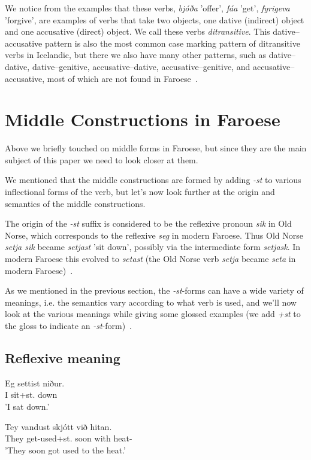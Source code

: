 \documentclass[12pt,%
]{lin-v2/lin}
\let\Oldsubsection\subsection
\renewcommand{\subsection}{\FloatBarrier\Oldsubsection}
\begin{document}
We notice from the examples that these verbs, \emph{bjóða} 'offer', \emph{fáa} 'get', \emph{fyrigeva} 'forgive', are
examples of verbs that take two objects, one dative (indirect) object and one accusative (direct) object. We call these verbs \emph{ditransitive}.
This dative--accusative pattern is also the most common case marking pattern of ditransitive verbs in Icelandic, but there
we also have many other patterns, such as dative--dative, dative--genitive, accusative--dative, accusative--genitive, and
accusative--accusative, most of which are not found in Faroese~\citep[262-263]{faroese}.


\section{Middle Constructions in Faroese}

Above we briefly touched on middle forms in Faroese, but since they are the main subject of this paper we need to look closer at them.

We mentioned that the middle constructions are formed by adding \emph{-st} to various inflectional forms of the verb,
but let's now look further at the origin and semantics of the middle constructions.

The origin of the \emph{-st} suffix is considered to be the reflexive pronoun \emph{sik} in Old Norse,
which corresponds to the reflexive \emph{seg} in modern Faroese. Thus Old Norse \emph{setja sik} became
\emph{setjast} 'sit down', possibly via the intermediate form \emph{setjask}.
In modern Faroese this evolved to \emph{setast} (the Old Norse verb \emph{setja} became \emph{seta} in
modern Faroese)~\citep[277]{faroese}.

As we mentioned in the previous section, the \emph{-st}-forms can have a wide variety of meanings,
i.e. the semantics vary according to what verb is used, and we'll now look at the various meanings
while giving some glossed examples (we add \emph{+st} to the gloss to 
indicate an \emph{-st}-form)~\citep[277-278]{faroese}.

\subsection*{Reflexive meaning}

\begin{exe}
    \ex
    \begin{xlist}
        \item \gll Eg settist niður.\\
        I sit+st.\Pst{} down\\
        \trans 'I sat down.'\\
        \item \gll Tey vandust skjótt við hitan.\\
        They {get-used}+st.\Pst{} soon with heat-\Def{}\\
        \trans 'They soon got used to the heat.'
    \end{xlist}
\end{exe}
\end{document}

